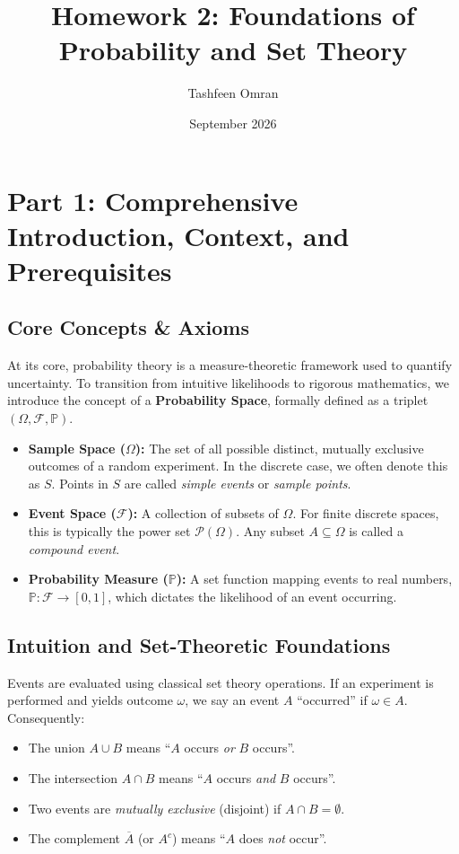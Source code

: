 \documentclass[11pt]{article}
\title{\textbf{Homework 2: Foundations of Probability and Set Theory}}
\author{Tashfeen Omran}
\date{September 2026}
\begin{document}
\maketitle
\tableofcontents
\newpage

\section{Part 1: Comprehensive Introduction, Context, and Prerequisites}

\subsection{Core Concepts \& Axioms}
At its core, probability theory is a measure-theoretic framework used to quantify uncertainty. To transition from intuitive likelihoods to rigorous mathematics, we introduce the concept of a \textbf{Probability Space}, formally defined as a triplet $(\Omega, \mathcal{F}, \mathbb{P})$. 
\begin{itemize}
    \item \textbf{Sample Space ($\Omega$):} The set of all possible distinct, mutually exclusive outcomes of a random experiment. In the discrete case, we often denote this as $S$. Points in $S$ are called \textit{simple events} or \textit{sample points}.
    \item \textbf{Event Space ($\mathcal{F}$):} A collection of subsets of $\Omega$. For finite discrete spaces, this is typically the power set $\mathcal{P}(\Omega)$. Any subset $A \subseteq \Omega$ is called a \textit{compound event}.
    \item \textbf{Probability Measure ($\mathbb{P}$):} A set function mapping events to real numbers, $\mathbb{P}: \mathcal{F} \to [0, 1]$, which dictates the likelihood of an event occurring.
\end{itemize}

\subsection{Intuition and Set-Theoretic Foundations}
Events are evaluated using classical set theory operations. If an experiment is performed and yields outcome $\omega$, we say an event $A$ ``occurred'' if $\omega \in A$. Consequently:
\begin{itemize}
    \item The union $A \cup B$ means ``$A$ occurs \textit{or} $B$ occurs''.
    \item The intersection $A \cap B$ means ``$A$ occurs \textit{and} $B$ occurs''.
    \item Two events are \textit{mutually exclusive} (disjoint) if $A \cap B = \emptyset$.
    \item The complement $\overline{A}$ (or $A^c$) means ``$A$ does \textit{not} occur''.
\end{itemize}
\end{document}
